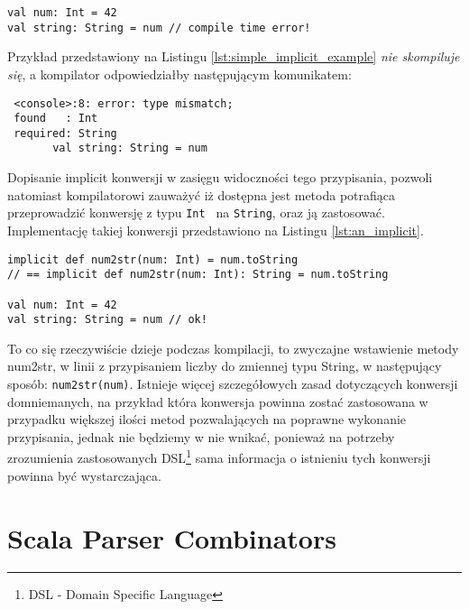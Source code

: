\begin{lstlisting}[caption={Przykład wystąpienia implicit conversion}, label={lst:simple_implicit_example}]
val num: Int = 42
val string: String = num // compile time error!
\end{lstlisting}

Przykład przedstawiony na Listingu \ref{lst:simple_implicit_example} \textit{nie skompiluje się}, a kompilator odpowiedziałby następującym komunikatem:

\begin{verbatim}
 <console>:8: error: type mismatch;
 found   : Int
 required: String
       val string: String = num
\end{verbatim}

Dopisanie implicit konwersji w zasięgu widoczności tego przypisania, pozwoli natomiast kompilatorowi zauważyć iż dostępna jest metoda potrafiąca przeprowadzić
konwersję z typu \verb|Int | na \verb|String|, oraz ją zastosować. Implementację takiej konwersji przedstawiono na Listingu \ref{lst:an_implicit}.

\begin{lstlisting}[caption={Implementacja oraz zastosowanie konwersji domniemanej --- \textit{Implicit Conversion}}, label={lst:an_implicit}]
implicit def num2str(num: Int) = num.toString
// == implicit def num2str(num: Int): String = num.toString

val num: Int = 42
val string: String = num // ok!
\end{lstlisting}

To co się rzeczywiście dzieje podczas kompilacji, to zwyczajne wstawienie metody num2str, w linii z przypisaniem liczby do zmiennej typu String,
w następujący sposób: \verb|num2str(num)|. Istnieje więcej szczegółowych zasad dotyczących konwersji domniemanych, na przykład która konwersja powinna zostać 
zastosowana w przypadku większej ilości metod pozwalających na poprawne wykonanie przypisania, jednak nie będziemy w nie wnikać, ponieważ na potrzeby zrozumienia
zastosowanych DSL\footnote{DSL - Domain Specific Language} sama informacja o istnieniu tych konwersji powinna być wystarczająca.




\section{Scala Parser Combinators}
\label{sec:scala_parser_combinators}
